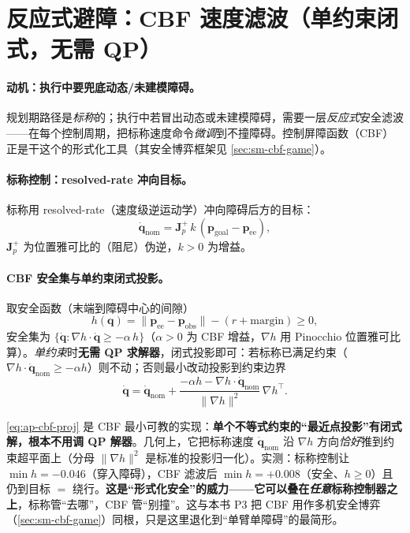 \section{反应式避障：CBF 速度滤波（单约束闭式，无需 QP）}
\label{sec:ap-cbf}

\paragraph{动机：执行中要兜底动态/未建模障碍。}
规划期路径是\emph{标称}的；执行中若冒出动态或未建模障碍，需要一层\emph{反应式}安全滤波——在每个控制周期，把标称速度命令\emph{微调}到不撞障碍。控制屏障函数（CBF）正是干这个的形式化工具（其安全博弈框架见 \cref{sec:sm-cbf-game}）。

\paragraph{标称控制：resolved-rate 冲向目标。}
标称用 resolved-rate（速度级逆运动学）冲向障碍后方的目标：
\begin{equation}
  \dot{\mathbf{q}}_{\mathrm{nom}}=\mathbf{J}_p^{+}\,k\,(\mathbf{p}_{\mathrm{goal}}-\mathbf{p}_{\mathrm{ee}}),
  \label{eq:ap-resolved-rate}
\end{equation}
$\mathbf{J}_p^{+}$ 为位置雅可比的（阻尼）伪逆，$k>0$ 为增益。

\paragraph{CBF 安全集与单约束闭式投影。}
取安全函数（末端到障碍中心的间隙）
\begin{equation}
  h(\mathbf{q})=\|\mathbf{p}_{\mathrm{ee}}-\mathbf{p}_{\mathrm{obs}}\|-(r+\mathrm{margin})\ge 0,
  \label{eq:ap-cbf-h}
\end{equation}
安全集为 $\{\dot{\mathbf{q}}:\nabla h\cdot\dot{\mathbf{q}}\ge -\alpha\,h\}$（$\alpha>0$ 为 CBF 增益，$\nabla h$ 用 Pinocchio 位置雅可比算）。\emph{单约束}时\textbf{无需 QP 求解器}，闭式投影即可：若标称已满足约束（$\nabla h\cdot\dot{\mathbf{q}}_{\mathrm{nom}}\ge -\alpha h$）则不动；否则最小改动投影到约束边界
\begin{equation}
  \dot{\mathbf{q}}=\dot{\mathbf{q}}_{\mathrm{nom}}+\frac{-\alpha h-\nabla h\cdot\dot{\mathbf{q}}_{\mathrm{nom}}}{\|\nabla h\|^2}\,\nabla h^\top.
  \label{eq:ap-cbf-proj}
\end{equation}

\begin{insight}\label{ins:ap-cbf}
\cref{eq:ap-cbf-proj} 是 CBF 最小可教的实现：\textbf{单个不等式约束的“最近点投影”有闭式解，根本不用调 QP 解器}。几何上，它把标称速度 $\dot{\mathbf{q}}_{\mathrm{nom}}$ 沿 $\nabla h$ 方向\emph{恰好}推到约束超平面上（分母 $\|\nabla h\|^2$ 是标准的投影归一化）。实测：标称控制让 $\min h=-0.046$（穿入障碍），CBF 滤波后 $\min h=+0.008$（安全、$h\ge0$）且仍到目标 $=$ 绕行。\textbf{这是“形式化安全”的威力——它可以叠在\emph{任意}标称控制器之上}，标称管“去哪”，CBF 管“别撞”。这与本书 P3 把 CBF 用作多机安全博弈（\cref{sec:sm-cbf-game}）同根，只是这里退化到“单臂单障碍”的最简形。
\end{insight}

